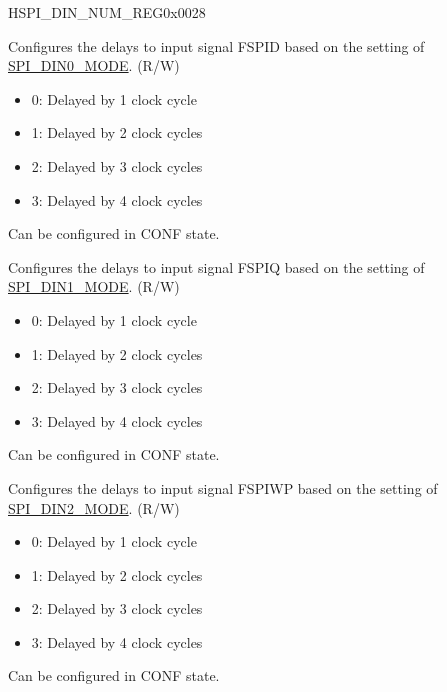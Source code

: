 \begin{register}{H}{SPI\_DIN\_NUM\_REG}{0x0028}\label{regdesc:SPIDINNUMREG}
%
%
%
%
%
\regnewline%
\begin{regdesc}\begin{reglist}
\label{fielddesc:SPIDIN0NUM}\item [SPI\_DIN0\_NUM] Configures the delays to input signal FSPID based on the setting of \hyperref[fielddesc:SPIDIN0MODE]{SPI\_DIN0\_MODE}. (R/W)\\
\begin{itemize}
    \item 0: Delayed by 1 clock cycle
    \item 1: Delayed by 2 clock cycles
    \item 2: Delayed by 3 clock cycles
    \item 3: Delayed by 4 clock cycles
\end{itemize}
Can be configured in CONF state. 
\label{fielddesc:SPIDIN1NUM}\item [SPI\_DIN1\_NUM] Configures the delays to input signal FSPIQ based on the setting of \hyperref[fielddesc:SPIDIN1MODE]{SPI\_DIN1\_MODE}. (R/W)\\
\begin{itemize}
    \item 0: Delayed by 1 clock cycle
    \item 1: Delayed by 2 clock cycles
    \item 2: Delayed by 3 clock cycles
    \item 3: Delayed by 4 clock cycles
\end{itemize}
Can be configured in CONF state. 
\label{fielddesc:SPIDIN2NUM}\item [SPI\_DIN2\_NUM] Configures the delays to input signal FSPIWP based on the setting of \hyperref[fielddesc:SPIDIN2MODE]{SPI\_DIN2\_MODE}. (R/W)\\
\begin{itemize}
    \item 0: Delayed by 1 clock cycle
    \item 1: Delayed by 2 clock cycles
    \item 2: Delayed by 3 clock cycles
    \item 3: Delayed by 4 clock cycles
\end{itemize}
Can be configured in CONF state. 

\end{reglist}
\end{regdesc}
\end{register}
